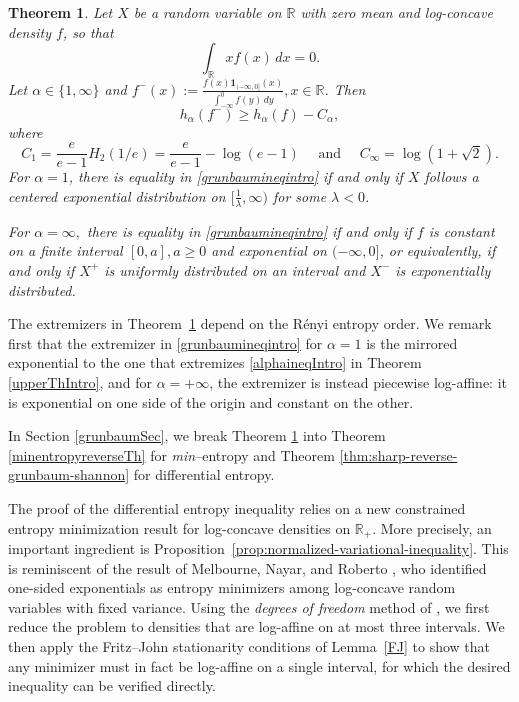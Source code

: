 \documentclass{article}
\theoremstyle{plain}
\newtheorem{theorem}{Theorem}
\theoremstyle{definition}
\newcommand{\1}{\mathbf 1}
\begin{document}
\begin{theorem}
\label{secondThIntro}
Let \(X\) be a random variable on $\mathbb R$ with zero mean and log-concave density \(f\), so that
\[
        \int_{\mathbb R} xf(x)\,dx=0.
\]
Let $\alpha \in \{1,\infty\}$ and $
f^{-}(x):=\frac{f(x)\mathbf 1_{(-\infty,0]}(x)}{\int_{-\infty}^{0} f(y)\,dy},  x \in \mathbb R
$.
Then
\begin{equation} \label{grunbaumineqintro}
        h_{\alpha}(f^-)
        \ge
        h_{\alpha}(f)-C_{\alpha},
\end{equation}
where 
$$
C_1 = \frac{e}{e-1}H_2(1/e)=\frac{e}{e-1}-\log(e-1) \quad \text{ and }  \quad C_{\infty} = \log(1+\sqrt{2}).
$$
For $\alpha = 1$, there is equality in \eqref{grunbaumineqintro} if and only if $X$ follows a centered exponential distribution on $[\frac{1}{\lambda}, \infty)$ for some $\lambda < 0$.

For $\alpha = \infty,$ there is equality in \eqref{grunbaumineqintro} if and only if $f$ is constant on a finite interval $[0,a], a \geq 0$ and exponential on $(-\infty, 0]$, or equivalently, if and only if $X^+$ is uniformly distributed on an interval and $X^-$ is exponentially distributed.
\end{theorem}
The extremizers in Theorem~\ref{secondThIntro} depend on the R\'enyi entropy
order. We remark first that the extremizer in \eqref{grunbaumineqintro} for $\alpha=1$ is the mirrored exponential to the one that extremizes \eqref{alphaineqIntro} in Theorem \ref{upperThIntro}, and  for $\alpha=+\infty$, the extremizer is instead
piecewise log-affine: it is exponential on one side of the origin and
constant on the other.


In Section \ref{grunbaumSec}, we break Theorem \ref{secondThIntro} into
Theorem \ref{minentropyreverseTh} for {\em min}--entropy and
Theorem \ref{thm:sharp-reverse-grunbaum-shannon} for differential entropy. 

The proof of the differential entropy inequality relies on a new
constrained entropy minimization result for log-concave densities on
$\mathbb R_+$. More precisely, an important ingredient is
Proposition~\ref{prop:normalized-variational-inequality}. This is reminiscent of the result of Melbourne, Nayar,
and Roberto \cite{MNR}, who identified one-sided exponentials as entropy
minimizers among log-concave random variables with fixed variance. Using the
\textit{degrees of freedom} method of \cite{fradeliziguedon}, we first reduce the
problem to densities that are log-affine on at most three intervals.
We then apply the Fritz--John stationarity conditions of
Lemma~\ref{FJ} to show that any minimizer must in fact be log-affine on
a single interval, for which the desired inequality can be verified
directly.
\end{document}
